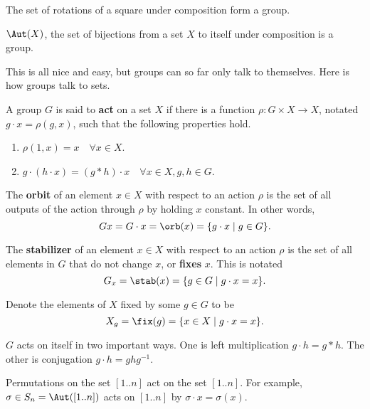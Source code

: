 \documentclass[letterpaper]{article}
\begin{document}
\begin{ex}
The set of rotations of a square under composition form a group.
\end{ex}

\begin{ex}
$\Aut(X)$, the set of bijections from a set $X$ to itself under composition is a
group.
\end{ex}

This is all nice and easy, but groups can so far only talk to themselves. Here
is how groups talk to sets.

\begin{df}
A group $G$ is said to \textbf{act} on a set $X$ if there is a function $\rho :
G \times X \to X$, notated $g \cdot x = \rho(g, x)$, such that the following
properties hold.
\begin{enumerate}
\item
$\rho(1, x) = x \quad \forall x \in X$.
\item
$g \cdot (h \cdot x) = (g * h) \cdot x \quad \forall x \in X, g, h \in G$.
\end{enumerate}
\end{df}

\begin{df}
The \textbf{orbit} of an element $x \in X$ with respect to an action $\rho$ is
the set of all outputs of the action through $\rho$ by holding $x$ constant. In
other words,
\[ Gx = G \cdot x = \orb(x) = \lbrace g \cdot x \mid g \in G \rbrace. \]
\end{df}

\begin{df}
The \textbf{stabilizer} of an element $x \in X$ with respect to an action $\rho$
is the set of all elements in $G$ that do not change $x$, or \textbf{fixes} $x$.
This is notated
\[ G_x = \stab(x) = \lbrace g \in G \mid g \cdot x = x \rbrace. \]
\end{df}

\begin{df}
Denote the elements of $X$ fixed by some $g \in G$ to be
\[ X_g = \fix(g) = \lbrace x \in X \mid g \cdot x = x \rbrace. \]
\end{df}

\begin{ex}
$G$ acts on itself in two important ways. One is left multiplication $g \cdot h
= g * h$. The other is conjugation $g \cdot h = ghg^{-1}$.
\end{ex}

\begin{ex}
Permutations on the set $[1..n]$ act on the set $[1..n]$. For example, $\sigma
\in S_n = \Aut([1..n])$ acts on $[1..n]$ by $\sigma \cdot x = \sigma(x)$.
\end{ex}
\end{document}

